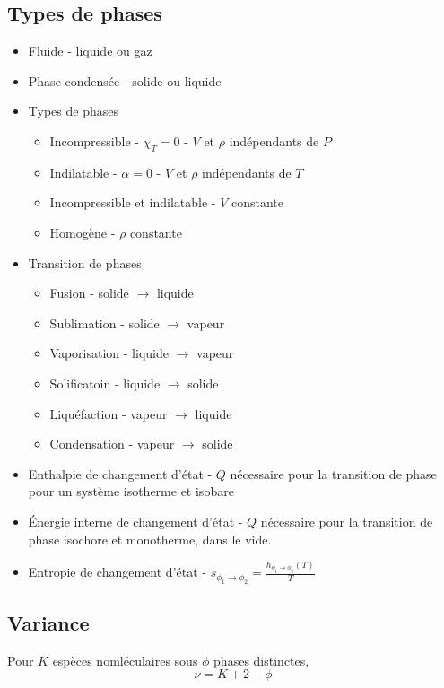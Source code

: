 \documentclass[openany]{book}
\begin{document}
\subsection{Types de phases}
\begin{itemize}
    \item Fluide - liquide ou gaz
    \item Phase condensée - solide ou liquide
    \item Types de phases
    \begin{itemize}
        \item Incompressible - $\chi_T = 0$ - $V$ et $\rho$ indépendants de $P$
        \item Indilatable - $\alpha = 0$ - $V$ et $\rho$ indépendants de $T$
        \item Incompressible et indilatable - $V$ constante
        \item Homogène - $\rho$ constante
    \end{itemize}
    \item Transition de phases
    \begin{itemize}
        \item Fusion - solide $\rightarrow$ liquide
        \item Sublimation - solide $\rightarrow$ vapeur
        \item Vaporisation - liquide $\rightarrow$ vapeur
        \item Solificatoin - liquide $\rightarrow$ solide
        \item Liquéfaction - vapeur $\rightarrow$ liquide
        \item Condensation - vapeur $\rightarrow$ solide
    \end{itemize}
    \item Enthalpie de changement d'état - $Q$ nécessaire pour la transition de phase pour un système isotherme et isobare
    \item Énergie interne de changement d'état - $Q$ nécessaire pour la transition de phase isochore et monotherme, dans le vide. 
    \item Entropie de changement d'état - $s_{\phi_1 \rightarrow \phi_2} = \frac{h_{\phi_1 \rightarrow \phi_2}(T)}{T}$
\end{itemize}

\subsection{Variance}
Pour $K$ espèces nomléculaires sous $\phi$ phases distinctes,
\[ \nu = K + 2 - \phi \]
\end{document}
